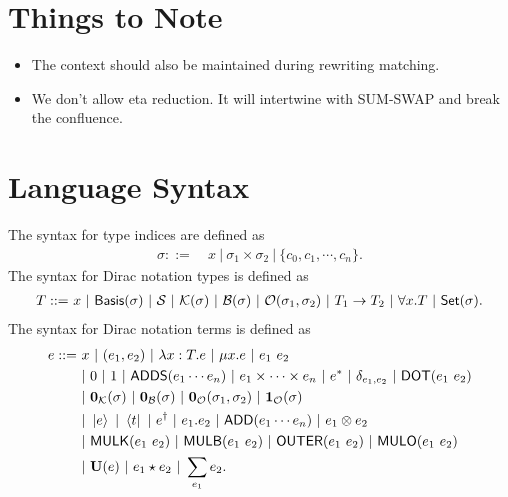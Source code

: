 \documentclass{article}
\begin{document}
\section{Things to Note}
\begin{itemize}
    \item The context should also be maintained during rewriting matching.
    \item We don't allow eta reduction. It will intertwine with SUM-SWAP and break the confluence.
\end{itemize}


\section{Language Syntax}
\begin{definition}[syntax]
    The syntax for type indices are defined as
    \begin{align*}
        \sigma ::=\ & x\ |\ \sigma_1 \times \sigma_2\ |\ \{c_0, c_1, \cdots, c_n\}.
    \end{align*}
    The syntax for Dirac notation types is defined as 
    \begin{align*}
        T ::=\ & x\ |\ \Basis(\sigma)\ |\ \SType\ |\ \KType(\sigma)\ |\ \BType(\sigma)\ |\ \OType(\sigma_1, \sigma_2)\ |\ T_1 \to T_2\ |\ \forall x.T\ |\ \SET(\sigma). \\
    \end{align*}
    The syntax for Dirac notation terms is defined as
    \begin{align*}
        e ::=\ & x\ |\ (e_1, e_2)\ |\ \lambda x : T.e\ |\ \mu x.e\ |\ e_1\ e_2 \\
        & |\ 0\ |\ 1\ |\ \ADDS(e_1 \cdots e_n) \ |\ e_1 \times \cdots \times e_n\ |\ e^* \ |\ \delta_{e_1, e_2}\ |\ \DOT(e_1\ e_2) \\
        & |\ \ZEROK(\sigma)\ |\ \ZEROB(\sigma)\ |\ \ZEROO(\sigma_1, \sigma_2)\ |\ \ONEO(\sigma) \\
        & |\ \ket{e}\ |\ \bra{t}\ |\ e^\dagger\ |\ e_1.e_2\ |\ \ADD(e_1 \cdots e_n)\ |\ e_1 \otimes e_2 \\
        & |\ \MULK(e_1\ e_2)\ |\ \MULB(e_1\ e_2)\ |\ \OUTER(e_1\ e_2)\ |\ \MULO(e_1\ e_2) \\
        & |\ \mathbf{U}(e)\ |\ e_1 \star e_2\ |\ \sum_{e_1} e_2.
    \end{align*}
\end{definition}
\end{document}
